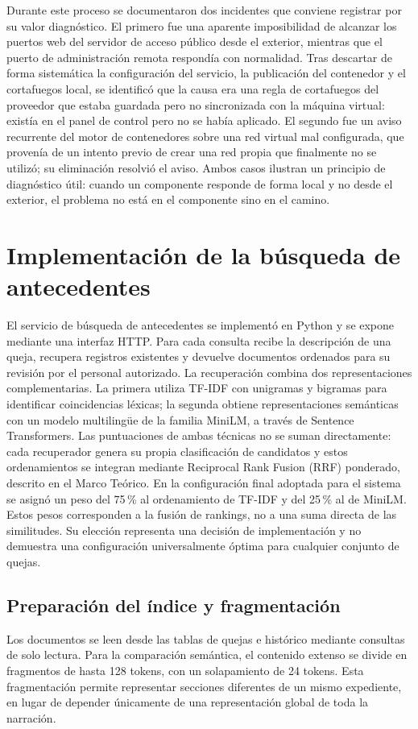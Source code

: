 Durante este proceso se documentaron dos incidentes que conviene registrar por su valor
diagnóstico. El primero fue una aparente imposibilidad de alcanzar los puertos web del servidor
de acceso público desde el exterior, mientras que el puerto de administración remota respondía
con normalidad. Tras descartar de forma sistemática la configuración del servicio, la publicación
del contenedor y el cortafuegos local, se identificó que la causa era una regla de cortafuegos
del proveedor que estaba guardada pero no sincronizada con la máquina virtual: existía en el panel
de control pero no se había aplicado. El segundo fue un aviso recurrente del motor de contenedores
sobre una red virtual mal configurada, que provenía de un intento previo de crear una red propia
que finalmente no se utilizó; su eliminación resolvió el aviso. Ambos casos ilustran un principio
de diagnóstico útil: cuando un componente responde de forma local y no desde el exterior, el
problema no está en el componente sino en el camino.

\section{Implementación de la búsqueda de antecedentes}
\label{sec:impl_antecedentes}
El servicio de búsqueda de antecedentes se implementó en Python y se expone mediante una
interfaz HTTP. Para cada consulta recibe la descripción de una queja, recupera registros
existentes y devuelve documentos ordenados para su revisión por el personal autorizado.
La recuperación combina dos representaciones complementarias. La primera utiliza TF-IDF
con unigramas y bigramas para identificar coincidencias léxicas; la segunda obtiene
representaciones semánticas con un modelo multilingüe de la familia MiniLM, a través
de Sentence Transformers. Las puntuaciones de ambas técnicas no se suman directamente:
cada recuperador genera su propia clasificación de candidatos y estos ordenamientos
se integran mediante Reciprocal Rank Fusion (RRF) ponderado, descrito en el Marco Teórico.
En la configuración final adoptada para el sistema se asignó un peso del 75\,\% al
ordenamiento de TF-IDF y del 25\,\% al de MiniLM. Estos pesos corresponden
a la fusión de rankings, no a una suma directa de las similitudes. Su elección
representa una decisión de implementación y no demuestra una configuración
universalmente óptima para cualquier conjunto de quejas.

\subsection{Preparación del índice y fragmentación}
Los documentos se leen desde las tablas de quejas e histórico mediante consultas de
solo lectura. Para la comparación semántica, el contenido extenso se divide en
fragmentos de hasta 128 tokens, con un solapamiento de 24 tokens. Esta fragmentación
permite representar secciones diferentes de un mismo expediente, en lugar de depender
únicamente de una representación global de toda la narración.


